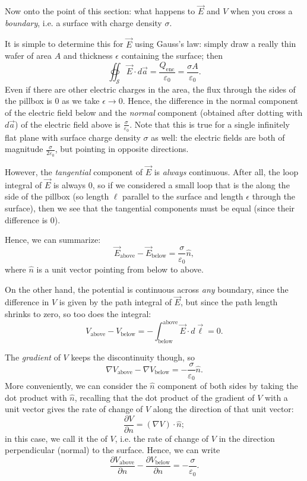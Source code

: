 Now onto the point of this section: what happens to $\vec{E}$ and $V$ when you cross a \textit{boundary}, i.e. a surface with charge density $\sigma$. 

It is simple to determine this for $\vec{E}$ using Gauss's law: simply draw a really thin wafer of area $A$ and thickness $\epsilon$ containing the surface; then
\[\oiint_{\mathcal{S}}\vec{E}\cdot d\vec{a}=\frac{Q_{\text{enc}}}{\varepsilon_0}=\frac{\sigma A}{\varepsilon_0}.\]
Even if there are other electric charges in the area, the flux through the sides of the pillbox is 0 as we take $\epsilon\to 0$. Hence, the difference in the normal component of the electric field below and the \textit{normal} component (obtained after dotting with $d\vec{a}$) of the electric field above is $\frac{\sigma}{\varepsilon_0}$. Note that this is true for a single infinitely flat plane with surface charge density $\sigma$ as well: the electric fields are both of magnitude $\frac{\sigma}{2\varepsilon_0}$, but pointing in opposite directions.

However, the \textit{tangential} component of $\vec{E}$ is \textit{always} continuous. After all, the loop integral of $\vec{E}$ is always $0$, so if we considered a small loop that is the along the side of the pillbox (so length $\ell$ parallel to the surface and length $\epsilon$ through the surface), then we see that the tangential components must be equal (since their difference is 0).

Hence, we can summarize:
\[\vec{E}_{\text{above}}-\vec{E}_{\text{below}}=\frac{\sigma}{\varepsilon_0}\hat{n},\]
where $\hat{n}$ is a unit vector pointing from below to above.

On the other hand, the potential is continuous across \textit{any} boundary, since the difference in $V$ is given by the path integral of $\vec{E}$, but since the path length shrinks to zero, so too does the integral:
\[V_{\text{above}}-V_{\text{below}}=-\int_{\text{below}}^{\text{above}}\vec{E}\cdot d\vec{\ell}=0.\]

The \textit{gradient} of $V$ keeps the discontinuity though, so
\[\nabla V_{\text{above}}-\nabla V_{\text{below}}=-\frac{\sigma}{\varepsilon_0}\hat{n}.\]
More conveniently, we can consider the $\hat{n}$ component of both sides by taking the dot product with $\hat{n}$, recalling that the dot product of the gradient of $V$ with a unit vector gives the rate of change of $V$ along the direction of that unit vector:
\[\frac{\partial V}{\partial n}=(\nabla V)\cdot\hat{n};\]
in this case, we call it the  of $V$, i.e. the rate of change of $V$ in the direction perpendicular (normal) to the surface. Hence, we can write
\[\frac{\partial V_{\text{above}}}{\partial n}-\frac{\partial V_{\text{below}}}{\partial n}=-\frac{\sigma}{\varepsilon_0}.\]

